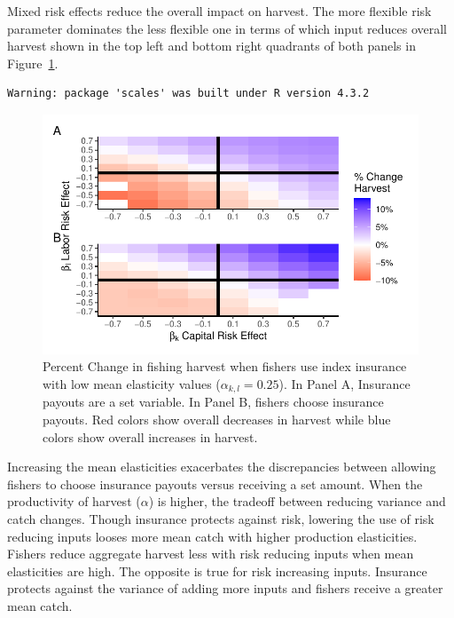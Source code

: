 \documentclass[
  super,
  preprint,
  3p]{elsarticle}
\theoremstyle{plain}
\theoremstyle{plain}
\theoremstyle{remark}
\begin{document}
Mixed risk effects reduce the overall impact on harvest. The more
flexible risk parameter dominates the less flexible one in terms of
which input reduces overall harvest shown in the top left and bottom
right quadrants of both panels in Figure~\ref{fig-multi-h-even}.

\begin{verbatim}
Warning: package 'scales' was built under R version 4.3.2
\end{verbatim}

\begin{figure}

{\centering \includegraphics{index-bc_files/figure-pdf/fig-multi-h-even-1.pdf}

}

\caption{\label{fig-multi-h-even}Percent Change in fishing harvest when
fishers use index insurance with low mean elasticity values
(\(\alpha_{k,l}=0.25\)). In Panel A, Insurance payouts are a set
variable. In Panel B, fishers choose insurance payouts. Red colors show
overall decreases in harvest while blue colors show overall increases in
harvest.}

\end{figure}

Increasing the mean elasticities exacerbates the discrepancies between
allowing fishers to choose insurance payouts versus receiving a set
amount. When the productivity of harvest (\(\alpha\)) is higher, the
tradeoff between reducing variance and catch changes. Though insurance
protects against risk, lowering the use of risk reducing inputs looses
more mean catch with higher production elasticities. Fishers reduce
aggregate harvest less with risk reducing inputs when mean elasticities
are high. The opposite is true for risk increasing inputs. Insurance
protects against the variance of adding more inputs and fishers receive
a greater mean catch.
\end{document}
